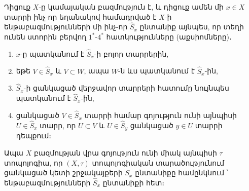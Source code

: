 \documentclass[./main.tex]{subfiles}
\begin{document}
\begin{theorem}\label{թեորեմ 3}
Դիցուք $X$-ը կա\-մա\-յա\-կան բազմություն է, և դիցուք ամեն մի $x\in X$ տարրի ինչ-որ եղանակով համադրված է $X$-ի ենթաբազմությունների մի ինչ-որ $\hat{S}_x$ ընտանիք այնպես, որ տեղի ունեն ստորին բերվող $1^{\ast}$-$4^{\ast}$ հատկությունները (աքսիոմները)․
\begin{enumerate}
    \item[1$^*$.]  $x$-ը պատկանում է $\hat{S}_x$-ի բոլոր տարրերին,

    \item[2$^*$.]  եթե $V\in \hat{S}_x$ և $V\subset W$, ապա $W$-ն ևս պատկանում է $\hat{S}_x$-ին,

    \item[3$^*$.]  $\hat{S}_x$-ի ցանկացած վերջավոր տարրերի հատումը նույնպես պատկանում է \linebreak $\hat{S}_x$-ին,

    \item[4$^*$.]  ցանկացած $V\in \hat{S}_x$ տարրի համար գոյություն ունի այնպիսի $U\in \hat{S}_x$ տարր, որ $U\subset V$ և $U\in \hat{S}_y$ ցանկացած $y\in U$ տարրի դեպքում։
\end{enumerate}
Ապա $X$ բազմության վրա գոյություն ունի միակ այնպիսի $\tau$ տոպոլոգիա, որ $(X, \tau )$ տոպոլոգիական տարա\-ծութ\-յունում ցանկացած կետի շրջակայքերի $S_x$ ընտանիքը համընկ\-նում ՝ ենթաբազմութ\-յուն\-ների $\hat{S}_x$ ընտանիքի հետ։
\end{theorem}
\end{document}
